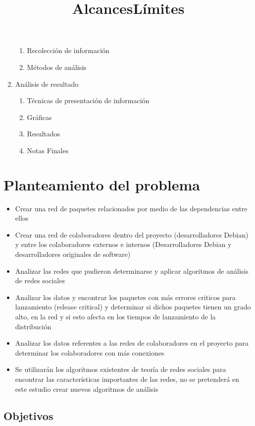 \documentclass[12pt]{report}
\begin{document}
\begin{enumerate}
\begin{enumerate}
  \item Recolección de información
  \item Métodos de análisis
  \end{enumerate}
\item Análisis de resultado
  \begin{enumerate}
  \item Técnicas de presentación de información
  \item Gráficas
  \item Resultados
  \item Notas Finales
  \end{enumerate}
\end{enumerate}

\chapter*{Planteamiento del problema}
\title{Alcances} 
\begin{itemize}
\item  Crear  una  red  de  paquetes relacionados  por  medio  de  las
dependencias entre ellos
\item   Crear   una  red   de   colaboradores   dentro  del   proyecto
(desarrolladores Debian) y entre los colaboradores externos e internos
(Desarrolladores Debian y desarrolladores originales de software)
\item  Analizar   las  redes  que  pudieron   determinarse  y  aplicar
algoritmos de análisis de redes sociales
\item  Analizar los  datos y  encontrar los  paquetes con  más errores
criticos para  lanzamiento (release  critical) y determinar  si dichos
paquetes tienen  un grado  alto, en  la red  y si  esto afecta  en los
tiempos de lanzamiento de la distribución
\item Analizar los datos referentes a las redes de colaboradores en el
proyecto para determinar los colaboradores con más conexiones
\end{itemize}
\title{Límites}
\begin{itemize}
\item  Se utilizarán  los  algoritmos existentes  de  teoría de  redes
  sociales  para  encontrar  las características  importantes  de  las
  redes, no se  pretenderá en este estudio crear  nuevos algoritmos de
  análisis
\end{itemize}


\section*{Objetivos}  %
\end{document}
